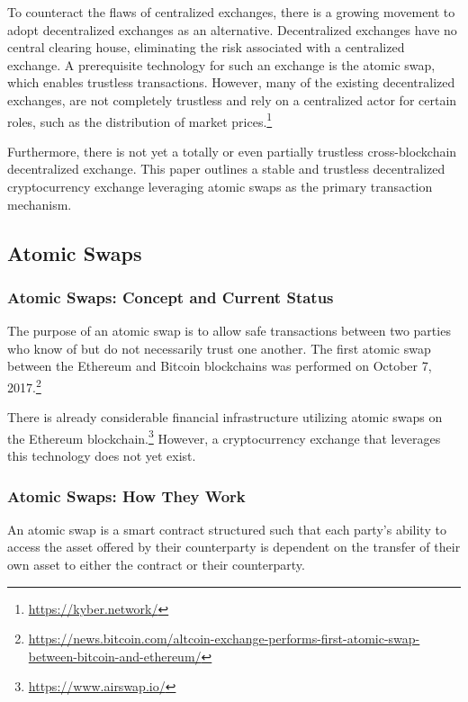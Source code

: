 \documentclass[a4paper]{article}
\begin{document}
    To counteract the flaws of centralized exchanges, there is a growing
    movement to adopt decentralized exchanges as an alternative.
    Decentralized exchanges have no central clearing house, eliminating the
    risk associated with a centralized exchange. A prerequisite technology
    for such an exchange is the atomic swap, which enables trustless
    transactions. However, many of the existing
    decentralized exchanges, are not completely trustless and rely
    on a centralized actor for certain roles, such as the distribution of
    market prices.\footnote[3]{\url{https://kyber.network/}}

    Furthermore, there is not yet a totally or even
    partially trustless cross-blockchain decentralized exchange.
    This paper outlines a stable and trustless
    decentralized cryptocurrency exchange leveraging atomic swaps
    as the primary transaction mechanism.
  	\subsection*{Atomic Swaps}
        \subsubsection*{Atomic Swaps: Concept and Current Status}
    	The purpose of an atomic swap is to allow safe
        transactions between two parties who know of but do not
        necessarily trust one another. The first atomic swap between
        the Ethereum and Bitcoin blockchains was performed on
        October 7, 2017.\footnote[4]{\url{https://news.bitcoin.com/altcoin-exchange-performs-first-atomic-swap-between-bitcoin-and-ethereum/}}

        There is already considerable financial infrastructure
        utilizing atomic swaps on the Ethereum
        blockchain.\footnote[5]{\url{https://www.airswap.io/}}
        However, a cryptocurrency exchange that leverages this technology
        does not yet exist.
        \subsubsection*{Atomic Swaps: How They Work}
        	An atomic swap is a smart contract structured such that
            each party's ability to access the asset offered by their
            counterparty is dependent on the transfer of their own
            asset to either the contract or their counterparty.
\end{document}
